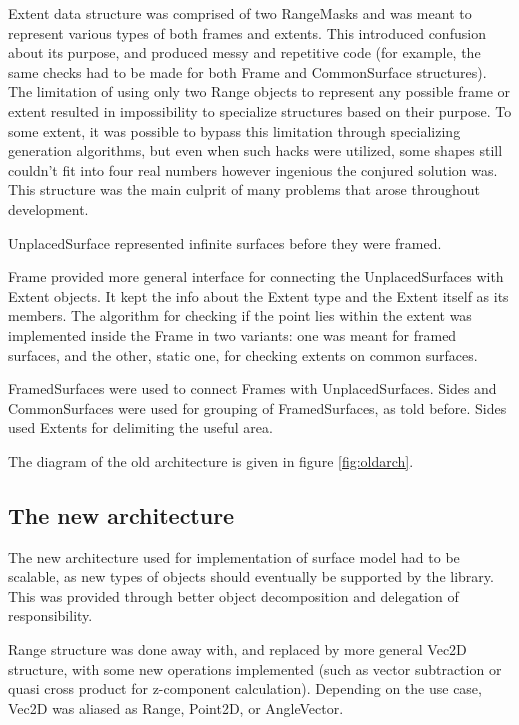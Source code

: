 \documentclass[12pt, a4paper]{article}
\begin{document}
Extent data structure was comprised of two RangeMasks and was meant to represent various types of both frames and extents. This introduced confusion about its purpose, and produced messy and repetitive code (for example, the same checks had to be made for both Frame and CommonSurface structures). The limitation of using only two Range objects to represent any possible frame or extent resulted in impossibility to specialize structures based on their purpose. To some extent, it was possible to bypass this limitation through specializing generation algorithms, but even when such hacks were utilized, some shapes still couldn't fit into four real numbers however ingenious the conjured solution was. This structure was the main culprit of many problems that arose throughout development.

UnplacedSurface represented infinite surfaces before they were framed.

Frame provided more general interface for connecting the UnplacedSurfaces with Extent objects. It kept the info about the Extent type and the Extent itself as its members. The algorithm for checking if the point lies within the extent was implemented inside the Frame in two variants: one was meant for framed surfaces, and the other, static one, for checking extents on common surfaces.

FramedSurfaces were used to connect Frames with UnplacedSurfaces. Sides and CommonSurfaces were used for grouping of FramedSurfaces, as told before. Sides used Extents for delimiting the useful area.

The diagram of the old architecture is given in figure \ref{fig:oldarch}.


\subsection{The new architecture}

The new architecture used for implementation of surface model had to be scalable, as new types of objects should eventually be supported by the library. This was provided through better object decomposition and delegation of responsibility.

Range structure was done away with, and replaced by more general Vec2D structure, with some new operations implemented (such as vector subtraction or quasi cross product for z-component calculation). Depending on the use case, Vec2D was aliased as Range, Point2D, or AngleVector. 
\end{document}
